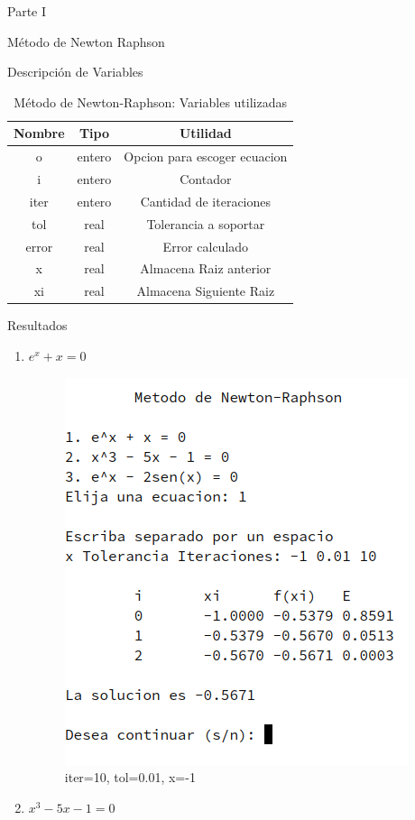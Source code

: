 \documentclass[legalpaper, 12pt]{article}
\def \eqa {\(e^x + x = 0\)}
\def \eqb {\(x^3 - 5x - 1 = 0\)}
\begin{document}
\begin{section}{Parte I}
\begin{subsection}{Método de Newton Raphson}
\begin{subsubsection}{Descripción de Variables}
\begin{table}[h]
\begin{tabular}{|c c c|}
            Nombre & Tipo & Utilidad\\
            \hline\hline
            o & entero & Opcion para escoger ecuacion \\
            i & entero & Contador \\
            iter & entero & Cantidad de iteraciones \\
            tol & real & Tolerancia a soportar \\
            error & real & Error calculado \\
            x & real & Almacena Raiz anterior\\
            xi & real & Almacena Siguiente Raiz\\
            \hline
          \end{tabular}
          \caption{Método de Newton-Raphson: Variables utilizadas}
        \end{table}
      \end{subsubsection}
      \newpage
      \begin{subsubsection}{Resultados}
        \begin{enumerate}
          \item \eqa
          \begin{figure}[h]
            \centering
            \includegraphics[scale=0.8]{new1.png}
            \caption{iter=10, tol=0.01, x=-1}
          \end{figure}
          \item \eqb
          \begin{figure}[h]

\end{figure}
\end{enumerate}
\end{subsubsection}
\end{subsection}
\end{section}
\end{document}
